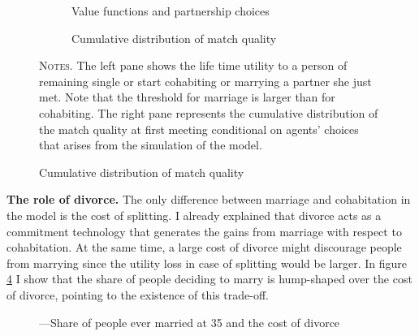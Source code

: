 \documentclass[12pt]{article}
\begin{document}
\begin{figure}[h!]
\caption{}
\label{fig:match_q}

\begin{subfigure}{.49\textwidth}
\centering
\vspace{0.16em}
\vspace{0.0em}
\caption{Value functions and partnership choices}
\label{fig:sub-firs1tq}
\scalebox{0.5}{ } 
\end{subfigure}
\begin{subfigure}{.49\textwidth}
\centering
\caption{Cumulative distribution of match quality}
\label{fig:sub-second1q}
\scalebox{0.5}{ } 
\end{subfigure}
\begin{minipage}{0.99\textwidth} %

\hspace{50em}

{\scriptsize \textsc{Notes.} The left pane shows the life time utility to a person of remaining single or start cohabiting or marrying a partner she just met. Note that the threshold for marriage is larger than for cohabiting. The right pane represents the cumulative distribution of the match quality at first meeting conditional on agents' choices that arises from the simulation of the model. \par}
\end{minipage}
\end{figure}

\textbf{The role of divorce.}  The only difference between marriage and cohabitation in the model is the cost of splitting. I already explained that divorce acts as a commitment technology that generates the gains from marriage with respect to cohabitation. At the same time, a large cost of divorce might discourage people from marrying since the utility loss in case of splitting would be larger. In figure \ref{fig:divor} I show that the share of people deciding to marry is hump-shaped over the cost of divorce, pointing to the existence of this trade-off.
\begin{figure}[h!]
	\centering
	\caption{---Share of people ever married at 35 and the cost of divorce} 
	\label{fig:divor}
	\hspace*{-1.5cm} 
	\resizebox{0.9\textwidth}{!}{}
\end{figure}
\end{document}
